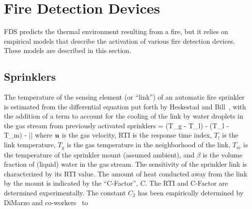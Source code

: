 
\chapter{Fire Detection Devices}

FDS predicts the thermal environment resulting from a fire, but it relies on empirical models that describe the
activation of various fire detection devices. These models are described in this section.


\section{Sprinklers}

The temperature of the sensing element (or ``link'') of an automatic fire sprinkler is estimated from
the differential equation put forth by Heskestad and Bill~\cite{Heskestad:3},
with the addition of a term to account for the cooling of the link
by water droplets in the gas stream from previously activated
sprinklers
\be {} =  (T_g - T_l) -
    (T_l - T_m) -  \beta |\bu|
   \label{actode} \ee
where ${\bf u}$ is the gas velocity, RTI is the response time index, $T_l$ is the link temperature,
$T_g$ is the gas temperature in the neighborhood of the link,
$T_m$ is the temperature of the sprinkler mount (assumed ambient),
and $\beta$ is the volume fraction of (liquid) water in the
gas stream. The sensitivity of the sprinkler link is characterized by
its RTI value. The amount of heat conducted away from the
link by the mount is indicated by the ``C-Factor'', $C$. The RTI and
C-Factor are determined experimentally. The constant
$C_2$ has been empirically determined by DiMarzo and
co-workers~\cite{Ruffino:1,Ruffino:2,Gavelli:1} to

